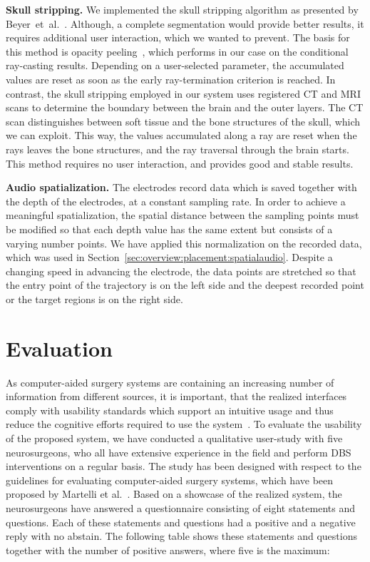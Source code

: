 \documentclass{vgtc}                          %
\begin{document}
\noindent \textbf{Skull stripping.} We implemented the skull stripping algorithm as presented by Beyer~et~al.~\cite{Beyer2007}. Although, a complete segmentation would provide better results, it requires additional user interaction, which we wanted to prevent. The basis for this method is opacity peeling~\cite{Rezk-salama2006}, which performs in our case on the conditional ray-casting results. Depending on a user-selected parameter, the accumulated values are reset as soon as the early ray-termination criterion is reached. In contrast, the skull stripping employed in our system uses registered CT and MRI scans to determine the boundary between the brain and the outer layers. The CT scan distinguishes between soft tissue and the bone structures of the skull, which we can exploit. This way, the values accumulated along a ray are reset when the rays leaves the bone structures, and the ray traversal through the brain starts. This method requires no user interaction, and provides good and stable results.

\noindent \textbf{Audio spatialization.} The electrodes record data which is saved together with the depth of the electrodes, at a constant sampling rate. In order to achieve a meaningful spatialization, the spatial distance between the sampling points must be modified so that each depth value has the same extent but consists of a varying number points. We have applied this normalization on the recorded data, which was used in Section~\ref{sec:overview:placement:spatialaudio}. Despite a changing speed in advancing the electrode, the data points are stretched so that the entry point of the trajectory is on the left side and the deepest recorded point or the target regions is on the right side.



\section{Evaluation}\label{sec:evaluation}
As computer-aided surgery systems are containing an increasing number of information from different sources, it is important, that the realized interfaces comply with usability standards which support an intuitive usage and thus reduce the cognitive efforts required to use the system~\cite{Visarius1997,Martelli2003}. To evaluate the usability of the proposed system, we have conducted a qualitative user-study with five neurosurgeons, who all have extensive experience in the field and perform DBS interventions on a regular basis. The study has been designed with respect to the guidelines for evaluating computer-aided surgery systems, which have been proposed by Martelli et al.~\cite{Martelli2003}. Based on a showcase of the realized system, the neurosurgeons have answered a questionnaire consisting of eight statements and questions. Each of these statements and questions had a positive and a negative reply with no abstain. The following table shows these statements and questions together with the number of positive answers, where five is the maximum:
\end{document}
